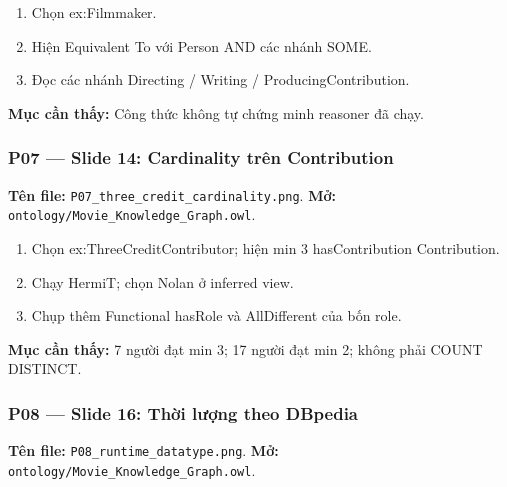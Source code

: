 \documentclass[
  11pt,
]{article}
\providecommand{\tightlist}{%
  \setlength{\itemsep}{0pt}\setlength{\parskip}{0pt}}
\begin{document}
\begin{enumerate}
\def\labelenumi{\arabic{enumi}.}
\tightlist
\item
  Chọn ex:\allowbreak{}\allowbreak{}Filmm\allowbreak{}aker.\allowbreak{}
\item
  Hiện Equivalent To với Person AND các nhánh SOME.
\item
  Đọc các nhánh Directing / Writing /
  Producin\allowbreak{}g\allowbreak{}Contrib\allowbreak{}ution.\allowbreak{}
\end{enumerate}

\textbf{Mục cần thấy:} Công thức không tự chứng minh reasoner đã chạy.

\subsubsection{P07 --- Slide 14: Cardinality trên
Contribution}\label{p07-slide-14-cardinality-truxean-contribution}

\textbf{Tên file:}
\texttt{P07\_\allowbreak{}thre\allowbreak{}e\_\allowbreak{}credit\allowbreak{}\_\allowbreak{}cardina\allowbreak{}lity.\allowbreak{}png\allowbreak{}}.
\textbf{Mở:}
\texttt{ontology\allowbreak{}/\allowbreak{}\allowbreak{}Movie\_\allowbreak{}\allowbreak{}K\allowbreak{}nowledge\allowbreak{}\_\allowbreak{}\allowbreak{}Graph.\allowbreak{}o\allowbreak{}wl}.

\begin{enumerate}
\def\labelenumi{\arabic{enumi}.}
\tightlist
\item
  Chọn
  ex:\allowbreak{}\allowbreak{}Three\allowbreak{}\allowbreak{}Credit\allowbreak{}Co\allowbreak{}ntributo\allowbreak{}r;
  hiện min 3 has\allowbreak{}Contr\allowbreak{}ibution
  Contribu\allowbreak{}tion.\allowbreak{}
\item
  Chạy HermiT; chọn Nolan ở inferred view.
\item
  Chụp thêm Functional hasRole và AllDifferent của bốn role.
\end{enumerate}

\textbf{Mục cần thấy:} 7 người đạt min 3; 17 người đạt min 2; không phải
COUNT DISTINCT.

\subsubsection{P08 --- Slide 16: Thời lượng theo
DBpedia}\label{p08-slide-16-thux1eddi-lux1b0ux1ee3ng-theo-dbpedia}

\textbf{Tên file:}
\texttt{P08\_\allowbreak{}runt\allowbreak{}ime\_\allowbreak{}data\allowbreak{}type.\allowbreak{}png\allowbreak{}}.
\textbf{Mở:}
\texttt{ontology\allowbreak{}/\allowbreak{}\allowbreak{}Movie\_\allowbreak{}\allowbreak{}K\allowbreak{}nowledge\allowbreak{}\_\allowbreak{}\allowbreak{}Graph.\allowbreak{}o\allowbreak{}wl}.
\end{document}

